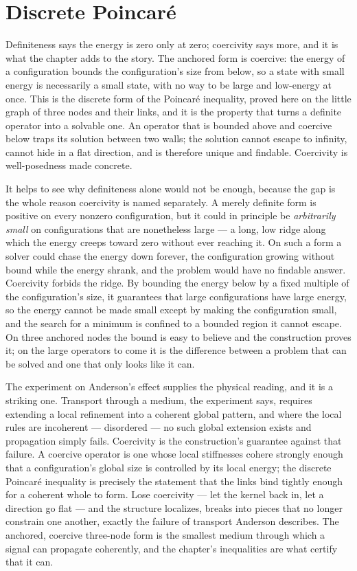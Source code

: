 \section{Discrete Poincar\'e}
\label{se:discrete-poincare}

Definiteness says the energy is zero only at zero; coercivity says more, and it is what the chapter adds
to the story. The anchored form is coercive: the energy of a configuration bounds the configuration's
size from below, so a state with small energy is necessarily a small state, with no way to be large and
low-energy at once. This is the discrete form of the Poincar\'e inequality, proved here on the little
graph of three nodes and their links, and it is the property that turns a definite operator into a
solvable one. An operator that is bounded above and coercive below traps its solution between two walls;
the solution cannot escape to infinity, cannot hide in a flat direction, and is therefore unique and
findable. Coercivity is well-posedness made concrete.

It helps to see why definiteness alone would not be enough, because the gap is the whole reason
coercivity is named separately. A merely definite form is positive on every nonzero configuration, but
it could in principle be \emph{arbitrarily small} on configurations that are nonetheless large --- a
long, low ridge along which the energy creeps toward zero without ever reaching it. On such a form a
solver could chase the energy down forever, the configuration growing without bound while the energy
shrank, and the problem would have no findable answer. Coercivity forbids the ridge. By bounding the
energy below by a fixed multiple of the configuration's size, it guarantees that large configurations
have large energy, so the energy cannot be made small except by making the configuration small, and the
search for a minimum is confined to a bounded region it cannot escape. On three anchored nodes the
bound is easy to believe and the construction proves it; on the large operators to come it is the
difference between a problem that can be solved and one that only looks like it can.

The experiment on Anderson's effect supplies the physical reading, and it is a striking one. Transport
through a medium, the experiment says, requires extending a local refinement into a coherent global
pattern, and where the local rules are incoherent --- disordered --- no such global extension exists and
propagation simply fails. Coercivity is the construction's guarantee against that failure. A coercive
operator is one whose local stiffnesses cohere strongly enough that a configuration's global size is
controlled by its local energy; the discrete Poincar\'e inequality is precisely the statement that the
links bind tightly enough for a coherent whole to form. Lose coercivity --- let the kernel back in, let a
direction go flat --- and the structure localizes, breaks into pieces that no longer constrain one
another, exactly the failure of transport Anderson describes. The anchored, coercive three-node form is
the smallest medium through which a signal can propagate coherently, and the chapter's inequalities are
what certify that it can.

